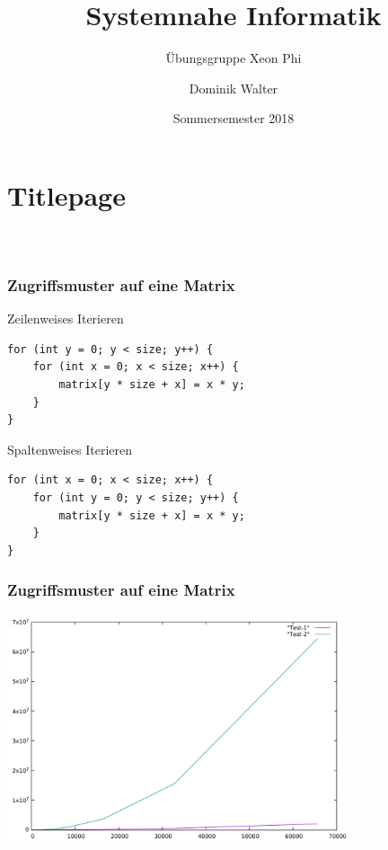 \documentclass[xcolor=pdftex,dvipsnames,table]{beamer}
\title{Systemnahe Informatik}
\subtitle{Übungsgruppe Xeon Phi}
\author{Dominik Walter}
\date{Sommersemester 2018}
\begin{document}
\section*{Titlepage}
\begin{frame}
  \frametitle{\ }
  \titlepage
\end{frame}


\begin{frame}[fragile]
	\frametitle{Zugriffsmuster auf eine Matrix}
	\begin{block}{Zeilenweises Iterieren}
		\begin{lstlisting}	
for (int y = 0; y < size; y++) {
	for (int x = 0; x < size; x++) {
		matrix[y * size + x] = x * y;
	}
}
		\end{lstlisting}
	\end{block}

	\begin{block}{Spaltenweises Iterieren}
		\begin{lstlisting}		
for (int x = 0; x < size; x++) {
	for (int y = 0; y < size; y++) {
		matrix[y * size + x] = x * y;
	}
}
		\end{lstlisting}
	\end{block}	
\end{frame}

\begin{frame}
	\frametitle{Zugriffsmuster auf eine Matrix}
	
	\includegraphics[width=10cm]{matrix_result.pdf}
\end{frame}
\end{document}
